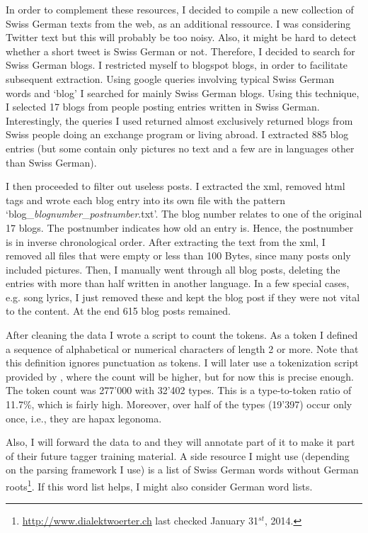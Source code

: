\documentclass[11pt,letterpaper, covington]{article}
\begin{document}
In order to complement these resources, I decided to compile a new collection of Swiss German texts from the web, as an additional ressource. I was considering Twitter text but this will probably be too noisy. Also, it might be hard to detect whether a short tweet is Swiss German or not. Therefore, I decided to search for Swiss German blogs. I restricted myself to blogspot blogs, in order to facilitate subsequent extraction. Using google queries involving typical Swiss German words and `blog' I searched for mainly Swiss German blogs. Using this technique, I selected 17 blogs from people posting entries written in Swiss German. Interestingly, the queries I used returned almost exclusively returned blogs from Swiss people doing an exchange program or living abroad. I extracted 885 blog entries (but some contain only pictures no text and a few are in languages other than Swiss German). 

I then proceeded to filter out useless posts. I extracted the xml, removed html tags and wrote each blog entry into its own file with the pattern `blog\_\emph{blognumber}\_\emph{postnumber}.txt'. The blog number relates to one of the original 17 blogs. The postnumber indicates how old an entry is. Hence, the postnumber is in inverse chronological order. After extracting the text from the xml, I removed all files that were empty or less than 100 Bytes, since many posts only included pictures. Then, I manually went through all blog posts, deleting the entries with more than half written in another language. In a few special cases, e.g. song lyrics, I just removed these and kept the blog post if they were not vital to the content. At the end 615 blog posts remained.

After cleaning the data I wrote a script to count the tokens. As a token I defined a sequence of alphabetical or numerical characters of length 2 or more. Note that this definition ignores punctuation as tokens. I will later use a tokenization script provided by \citet{AH14}, where the count will be higher, but for now this is precise enough. The token count was 277'000 with 32'402 types. This is a type-to-token ratio of 11.7\%, which is fairly high. Moreover, over half of the types (19'397) occur only once, i.e., they are hapax legonoma.

Also, I will forward the data to \citet{AH14} and they will annotate part of it to make it part of their future tagger training material. A side resource I might use (depending on the parsing framework I use) is a list of Swiss German words without German roots\footnote{\url{http://www.dialektwoerter.ch} last checked January 31$^{st}$, 2014.}. If this word list helps, I might also consider German word lists.
\end{document}
